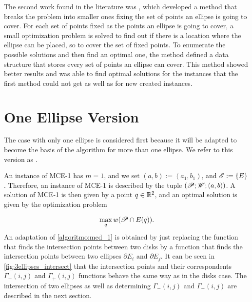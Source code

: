 The second work found in the literature was , which developed a method that breaks the problem into smaller ones fixing the set of points an ellipse is going to cover. For each set of points fixed as the points an ellipse is going to cover, a small optimization problem is solved to find out if there is a location where the ellipse can be placed, so to cover the set of fixed points. To enumerate the possible solutions and then find an optimal one, the method defined a data structure that stores every set of points an ellipse can cover. This method showed better results and was able to find optimal solutions for the instances that the first method could not get as well as for new created instances.

\section{One Ellipse Version}

The case with only one ellipse is considered first because it will be adapted to become the basis of the algorithm for more than one ellipse. We refer to this version as . 

An instance of MCE-1 has $m=1$, and we set $(a, b):=(a_1, b_1)$, and $\mathscr{E} := \{E\}$. Therefore, an instance of MCE-1 is described by the tuple $(\mathscr{P}; \mathscr{W}; (a, b))$. A solution of MCE-1 is then given by a point $q\in\mathbb{R}^2$, and an optimal solution is given by the optimization problem

\begin{equation*}
\max_q w(\mathscr{P} \cap E(q)).
\end{equation*}
An adaptation of \autoref{algoritmo:mcd_1} is obtained by just replacing the function that finds the intersection points between two disks by a function that finds the intersection points between two ellipses $\partial E_i$ and $\partial E_j$.
It can be seen in \autoref{fig:3ellipses_intersect} that the intersection points and their correspondents $\Gamma_-(i,j)$ and $\Gamma_+(i,j)$ functions behave the same way as in the disks case.
The intersection of two ellipses as well as determining $\Gamma_-(i,j)$ and $\Gamma_+(i,j)$ are described in the next section.

